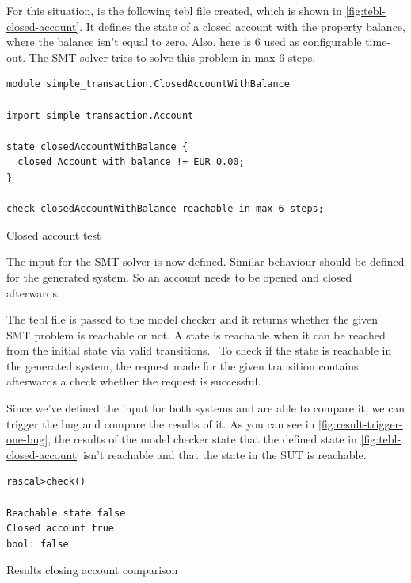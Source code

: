 For this situation, is the following tebl file created, which is shown in
\autoref{fig:tebl-closed-account}. It defines the state of a closed account with
the property balance, where the balance isn't equal to zero. Also, here is 6
used as configurable time-out. The SMT solver tries to solve this problem in
max 6 steps.

\begin{sourcecode}[h!]
\begin{lstlisting}[]
module simple_transaction.ClosedAccountWithBalance

import simple_transaction.Account

state closedAccountWithBalance {
  closed Account with balance != EUR 0.00;
}

check closedAccountWithBalance reachable in max 6 steps;
\end{lstlisting}
\caption{Closed account test}\label{fig:tebl-closed-account}
\end{sourcecode}
\FloatBarrier

The input for the SMT solver is now defined. Similar behaviour should be defined
for the generated system. So an account needs to be opened and closed
afterwards.

The tebl file is passed to the model checker and it returns whether the given
SMT problem is reachable or not. A state is reachable when it can be reached
from the initial state via valid
transitions.~\cite[p.~4]{stoel_storm_vinju_bosman_2016} To check if the state is
reachable in the generated system, the request made for the given transition
contains afterwards a check whether the request is successful.

Since we've defined the input for both systems and are able to compare it, we
can trigger the bug and compare the results of it. As you can see in
\autoref{fig:result-trigger-one-bug}, the results of the model checker state
that the defined state in \autoref{fig:tebl-closed-account} isn't reachable and
that the state in the SUT is reachable.

\begin{sourcecode}[h!]
\begin{lstlisting}[]
rascal>check()

Reachable state false
Closed account true
bool: false
\end{lstlisting}
\caption{Results closing account comparison}\label{fig:result-trigger-one-bug}
\end{sourcecode}
\FloatBarrier


